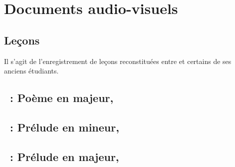 \chapter[%
Documents audio-visuels][%
Documents audio-visuels]{%
Documents audio-visuels}
\label{chap:Documents}

\section*{Leçons}

Il s'agit de l'enregistrement de leçons reconstituées entre \VSofronitsky{}
et certains de ses anciens étudiants.

\section[%
Skrjabin~:
Poème en \kF \Sharp majeur, \Opus{32} \Number{1}]{%
\Scriabine{}~:
Poème en \kF \Sharp majeur,  }

\begin{workitemize}
 \item{}
 \begin{perfitemize}
  \item{}
 \end{perfitemize}
\end{workitemize}

\section[%
Skrjabin~:
Prélude en \kE mineur, \Opus{11} \Number{4}]{%
\Scriabine{}~:
Prélude en \kE mineur,  }

\begin{workitemize}
 \item{}
 \begin{perfitemize}
  \item{}
 \end{perfitemize}
\end{workitemize}

\section[%
Skrjabin~:
Prélude en \kD majeur, \Opus{11} \Number{5}]{%
\Scriabine{}~:
Prélude en \kD majeur,  }

